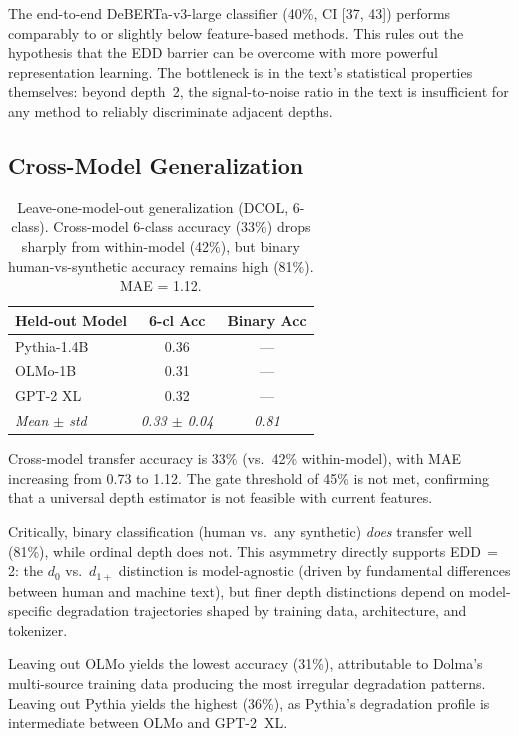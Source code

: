 \documentclass[11pt,a4paper]{article}
\begin{document}
The end-to-end DeBERTa-v3-large classifier (40\%, CI [37, 43]) performs comparably to or slightly below feature-based methods.
This rules out the hypothesis that the EDD barrier can be overcome with more powerful representation learning.
The bottleneck is in the text's statistical properties themselves: beyond depth~2, the signal-to-noise ratio in the text is insufficient for any method to reliably discriminate adjacent depths.

\subsection{Cross-Model Generalization}
\label{sec:cross_model}

\begin{table}[t]
\centering
\small
\begin{tabular}{lcc}
\toprule
\textbf{Held-out Model} & \textbf{6-cl Acc} & \textbf{Binary Acc} \\
\midrule
Pythia-1.4B & 0.36 & --- \\
OLMo-1B & 0.31 & --- \\
GPT-2 XL & 0.32 & --- \\
\midrule
\emph{Mean $\pm$ std} & \emph{0.33 $\pm$ 0.04} & \emph{0.81} \\
\bottomrule
\end{tabular}
\caption{Leave-one-model-out generalization (DCOL, 6-class). Cross-model 6-class accuracy (33\%) drops sharply from within-model (42\%), but binary human-vs-synthetic accuracy remains high (81\%). MAE = 1.12.}
\label{tab:loo_model}
\end{table}

Cross-model transfer accuracy is 33\% (vs.\ 42\% within-model), with MAE increasing from 0.73 to 1.12.
The gate threshold of 45\% is not met, confirming that a universal depth estimator is not feasible with current features.

Critically, binary classification (human vs.\ any synthetic) \emph{does} transfer well (81\%), while ordinal depth does not.
This asymmetry directly supports EDD\,$=$\,2: the $d_0$ vs.\ $d_{1+}$ distinction is model-agnostic (driven by fundamental differences between human and machine text), but finer depth distinctions depend on model-specific degradation trajectories shaped by training data, architecture, and tokenizer.

Leaving out OLMo yields the lowest accuracy (31\%), attributable to Dolma's multi-source training data producing the most irregular degradation patterns.
Leaving out Pythia yields the highest (36\%), as Pythia's degradation profile is intermediate between OLMo and GPT-2~XL.
\end{document}
